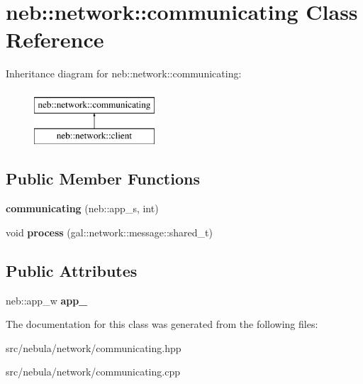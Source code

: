 \hypertarget{classneb_1_1network_1_1communicating}{\section{neb\-:\-:network\-:\-:communicating \-Class \-Reference}
\label{classneb_1_1network_1_1communicating}
}
\-Inheritance diagram for neb\-:\-:network\-:\-:communicating\-:\begin{figure}[H]
\begin{center}
\leavevmode
\includegraphics[height=2.000000cm]{classneb_1_1network_1_1communicating}
\end{center}
\end{figure}
\subsection*{\-Public \-Member \-Functions}
\begin{DoxyCompactItemize}
\item 
\hypertarget{classneb_1_1network_1_1communicating_aa56d7ee8b8546ecc25b2cc63603184e9}{{\bfseries communicating} (neb\-::app\-\_\-s, int)}\label{classneb_1_1network_1_1communicating_aa56d7ee8b8546ecc25b2cc63603184e9}

\item 
\hypertarget{classneb_1_1network_1_1communicating_a98c549330850584cd5ec57028785b777}{void {\bfseries process} (gal\-::network\-::message\-::shared\-\_\-t)}\label{classneb_1_1network_1_1communicating_a98c549330850584cd5ec57028785b777}

\end{DoxyCompactItemize}
\subsection*{\-Public \-Attributes}
\begin{DoxyCompactItemize}
\item 
\hypertarget{classneb_1_1network_1_1communicating_a9bac744763987c357b07a070ce2f1215}{neb\-::app\-\_\-w {\bfseries app\-\_\-}}\label{classneb_1_1network_1_1communicating_a9bac744763987c357b07a070ce2f1215}

\end{DoxyCompactItemize}


\-The documentation for this class was generated from the following files\-:\begin{DoxyCompactItemize}
\item 
src/nebula/network/communicating.\-hpp\item 
src/nebula/network/communicating.\-cpp\end{DoxyCompactItemize}
